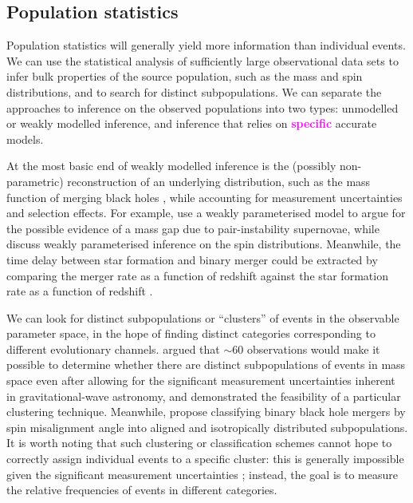 \documentclass[review]{elsarticle}
\newcommand{\ilya}[1]{\textcolor{magenta}{\bf{#1}}}
\begin{document}
\subsection{Population statistics}

Population statistics will generally yield more information than individual events.  We can use the statistical analysis of sufficiently large observational data sets to infer bulk properties of the source population, such as the mass and spin distributions, and to search for distinct subpopulations.  We can separate the approaches to inference on the observed populations into two types: unmodelled or weakly modelled inference, and inference that relies on \ilya{specific} accurate models. 

At the most basic end of weakly modelled inference is the (possibly non-parametric) reconstruction of an underlying distribution, such as the mass function of merging black holes \citep{Mandel:2010stat,BBH:O1}, while accounting for measurement uncertainties and selection effects.  For example, \citet{Fishbach:2017mass} use a weakly parameterised model to argue for the possible evidence of a mass gap due to pair-instability supernovae, while \citet{TalbotThrane:2017} discuss weakly parameterised inference on the spin distributions.  Meanwhile, the time delay between star formation and binary merger could be extracted by comparing the merger rate as a function of redshift against the star formation rate as a function of redshift \citep{Mandel:2016select}.  

We can look for distinct subpopulations or ``clusters'' of events in the observable parameter space, in the hope of finding distinct categories corresponding to different evolutionary channels.  \citet{Mandel:2015} argued that $\sim 60$ observations would make it possible to determine whether there are distinct subpopulations of events in mass space even after allowing for the significant measurement uncertainties inherent in gravitational-wave astronomy, and \citet{Mandel:2016cluster} demonstrated the feasibility of a particular clustering technique.  Meanwhile, \citet{Farr:2018} propose classifying binary black hole mergers by spin misalignment angle into aligned and isotropically distributed subpopulations.  It is worth noting that such clustering or classification schemes cannot hope to correctly assign individual events to a specific cluster: this is generally impossible given the significant measurement uncertainties \citep{Littenberg:2015}; instead, the goal is to measure the relative frequencies of events in different categories.
\end{document}
